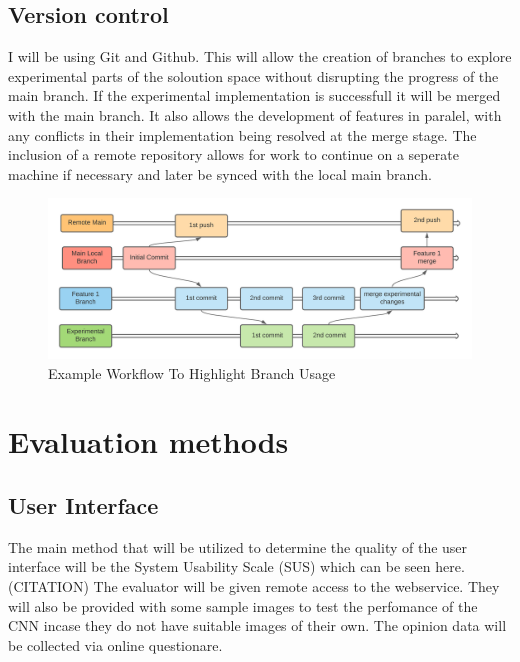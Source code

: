   \subsection{Version control}
    I will be using Git and Github. This will allow the creation of branches to explore experimental parts of the soloution space without disrupting the progress of the main branch. If the experimental implementation is successfull it will be merged with the main branch. It also allows the development of features in paralel, with any conflicts in their implementation being resolved at the merge stage. The inclusion of a remote repository allows for work to continue on a seperate machine if necessary and later be synced with the local main branch.
    \begin{figure}[H]
      \begin{center}
        \includegraphics[scale=0.7]{Images/Git_Workflow_Diagram}
        \caption{Example Workflow To Highlight Branch Usage}
        \label{fig:Git Workflow}
      \end{center}
    \end{figure}

\section{Evaluation methods}
  \subsection{User Interface}
  The main method that will be utilized to determine the quality of the user interface will be the System Usability Scale (SUS) which can be seen here. (CITATION) %
  The evaluator will be given remote access to the webservice. They will also be provided with some sample images to test the perfomance of the CNN incase they do not have suitable images of their own.
  The opinion data will be collected via online questionare.
